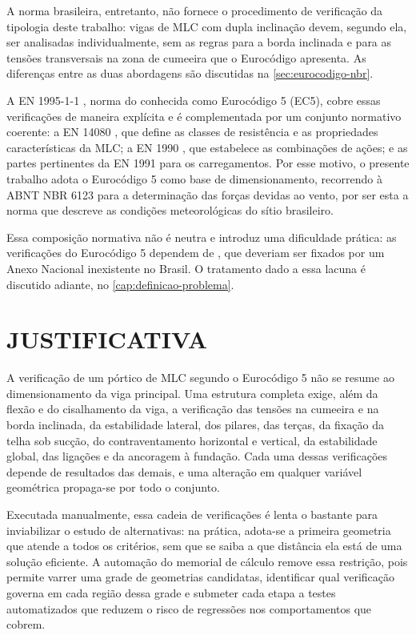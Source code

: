A norma brasileira, entretanto, não fornece o procedimento de verificação da
tipologia deste trabalho: vigas de MLC com dupla inclinação devem, segundo ela,
ser analisadas individualmente, sem as regras para a borda inclinada e para as
tensões transversais na zona de cumeeira que o Eurocódigo apresenta. As
diferenças entre as duas abordagens são discutidas na
\autoref{sec:eurocodigo-nbr}.

A EN 1995-1-1 \cite{EN1995-1-1:2004}, norma do
 conhecida como Eurocódigo 5
(EC5), cobre essas verificações
de maneira explícita e é complementada por um conjunto normativo coerente: a
EN 14080 \cite{EN14080:2013}, que define as classes de resistência e as propriedades
características da MLC; a EN 1990 \cite{EN1990:2002}, que estabelece as combinações
de ações; e as partes pertinentes da EN 1991 para os carregamentos. Por esse
motivo, o presente trabalho adota o Eurocódigo 5 como base de dimensionamento,
recorrendo à ABNT NBR 6123 \cite{NBR6123:2023} para a determinação das forças devidas ao
vento, por ser esta a norma que descreve as condições meteorológicas do sítio
brasileiro.

Essa composição normativa não é neutra e introduz uma dificuldade prática: as
verificações do Eurocódigo 5 dependem de
, que deveriam ser
fixados por um Anexo Nacional inexistente no Brasil. O tratamento dado a essa
lacuna é discutido adiante, no \autoref{cap:definicao-problema}.

\section{JUSTIFICATIVA}\label{sec:justificativa}

A verificação de um pórtico de MLC segundo o Eurocódigo 5 não se resume ao
dimensionamento da viga principal. Uma estrutura completa exige, além da flexão e
do cisalhamento da viga, a verificação das tensões na cumeeira e na borda
inclinada, da estabilidade lateral, dos pilares, das terças, da fixação da
telha sob sucção, do contraventamento horizontal e vertical, da estabilidade
global, das ligações e da ancoragem à fundação. Cada uma dessas verificações
depende de resultados das demais, e uma alteração em qualquer variável
geométrica propaga-se por todo o conjunto.

Executada manualmente, essa cadeia de verificações é lenta o bastante para
inviabilizar o estudo de alternativas: na prática, adota-se a primeira
geometria que atende a todos os critérios, sem que se saiba a que distância ela
está de uma solução eficiente. A automação do memorial de cálculo remove essa
restrição, pois permite varrer uma grade de geometrias candidatas, identificar
qual verificação governa em cada região dessa grade e submeter cada etapa a
testes automatizados que reduzem o risco de regressões nos comportamentos que
cobrem.

